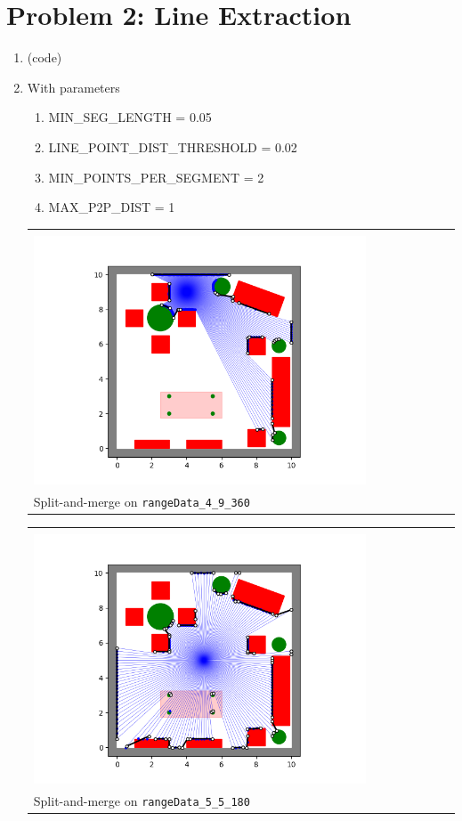 \documentclass{article}
\begin{document}
\section*{Problem 2: Line Extraction}
\begin{enumerate}[label=(\roman*)]
\item %
(code)

\item %

With parameters
\begin{enumerate}
	\item MIN\_SEG\_LENGTH = 0.05
	\item LINE\_POINT\_DIST\_THRESHOLD = 0.02
	\item MIN\_POINTS\_PER\_SEGMENT = 2
	\item MAX\_P2P\_DIST = 1
\end{enumerate}


\begin{tabular}[t]{l}
	\hline \\
	\includegraphics[width=0.80\textwidth]{img/rangeData_4_9_360.png} \\
	\hline
	Split-and-merge on \texttt{rangeData\_4\_9\_360} \\
\end{tabular}

\begin{tabular}[t]{l}
	\hline \\
	\includegraphics[width=0.80\textwidth]{img/rangeData_5_5_180.png} \\
	\hline
	Split-and-merge on \texttt{rangeData\_5\_5\_180} \\
\end{tabular}


\end{enumerate}
\end{document}
